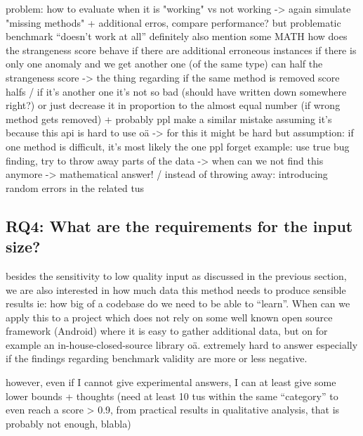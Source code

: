 problem: how to evaluate when it is "working" vs not working
    -> again simulate "missing methods" + additional erros, compare performance?
    but problematic benchmark ``doesn't work at all''
definitely also mention some MATH
    how does the strangeness score behave if there are additional erroneous instances
    if there is only one anomaly and we get another one (of the same type) can half the strangeness score
    -> the thing regarding if the same method is removed score halfs / if it's another one it's not so bad (should have written down somewhere right?)
    or just decrease it in proportion to the almost equal number (if wrong method gets removed)
    + probably ppl make a similar mistake assuming it's because this api is hard to use oä -> for this it might be hard
    but assumption: if one method is difficult, it's most likely the one ppl forget
example: use true bug finding, try to throw away parts of the data -> when can we not find this anymore -> mathematical answer!
/ instead of throwing away: introducing random errors in the related tus


\subsection{RQ4: What are the requirements for the input size?}

besides the sensitivity to low quality input as discussed in the previous section, we are also interested in how much data this method needs to produce sensible results
ie: how big of a codebase do we need to be able to ``learn''. When can we apply this to a project which does not rely on some well known open source framework (Android) where it is easy to gather additional data, but on for example an in-house-closed-source library oä.
extremely hard to answer especially if the findings regarding benchmark validity are more or less negative.

however, even if I cannot give experimental answers, I can at least give some lower bounds + thoughts
(need at least 10 tus within the same ``category'' to even reach a score > 0.9, from practical results in qualitative analysis, that is probably not enough, blabla)

